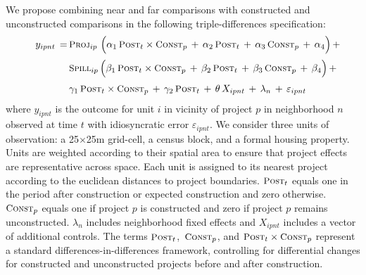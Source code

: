 \documentclass[12pt]{article}
\begin{document}
We propose combining near and far comparisons with constructed and unconstructed comparisons in the following triple-differences specification:
\begin{align}\label{eq:main}
\begin{split}
\quad y_{ipnt} \, =& \,   \textsc{\small Proj}_{ip} \,\, \Big( \alpha_1 \, \textsc{\small Post}_{t}\times\textsc{\small Const}_{p} \, + \, \alpha_2 \, \textsc{\small Post}_{t} \, + \, \alpha_3 \, \textsc{\small Const}_{p}\, +\, \alpha_4 \Big) \, + \\[.2em]
& \, \textsc{\small Spill}_{ip} \, \Big( \beta_1 \, \textsc{\small Post}_{t}\times\textsc{\small Const}_{p} \, + \, \beta_2 \, \textsc{\small Post}_{t} \, + \, \beta_3 \, \textsc{\small Const}_{p} \, +\, \beta_4 \Big) \, + \\[.2em]
& \, \gamma_1 \,  \textsc{\small Post}_{t}\times\textsc{\small Const}_{p} \, + \, \gamma_2 \,\textsc{\small Post}_{t} \, +  \, \theta \, X_{ipnt} \, + \, \lambda_n \, + \, \varepsilon_{ipnt} \quad 
\end{split}
\end{align}  %
\noindent where $y_{ipnt}$ is the outcome for unit $i$ in vicinity of project $p$ in neighborhood $n$ observed at time $t$ with idiosyncratic error $\varepsilon_{ipnt}$.  We consider three units of observation: a 25$\times$25m grid-cell, a census block, and a formal housing property.  Units are weighted according to their spatial area to ensure that project effects are representative across space.  Each unit is assigned to its nearest project according to the euclidean distances to project boundaries.  $\textsc{\small Post}_{t}$ equals one in the period after construction or expected construction and zero otherwise.  $\textsc{\small Const}_{p}$ equals one if project $p$ is constructed and zero if project $p$ remains unconstructed.  $\lambda_{n}$ includes neighborhood fixed effects and $X_{ipnt}$ includes a vector of additional controls.  The terms $\textsc{\small Post}_{t}$, $\,\textsc{\small Const}_{p}$, and $\textsc{\small Post}_{t}\times\textsc{\small Const}_{p}$ represent a standard differences-in-differences framework, controlling for differential changes for constructed and unconstructed projects before and after construction.  
\end{document}
